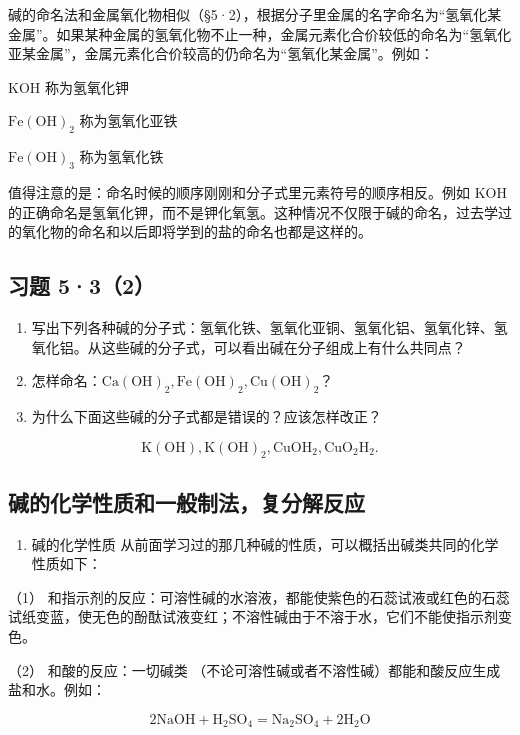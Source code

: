 碱的命名法和金属氧化物相似（§5·2），根据分子里金属的名字命名为``氢氧化某金属''。如果某种金属的氢氧化物不止一种，金属元素化合价较低的命名为``氢氧化亚某金属''，金属元素化合价较高的仍命名为``氢氧化某金属''。例如：

KOH 称为氢氧化钾

\(\mathrm{Fe(OH)}_{2}\) 称为氢氧化亚铁

\(\mathrm{Fe(OH)}_{3}\) 称为氢氧化铁

值得注意的是：命名时候的顺序刚刚和分子式里元素符号的顺序相反。例如 KOH
的正确命名是氢氧化钾，而不是钾化氧氢。这种情况不仅限于碱的命名，过去学过的氧化物的命名和以后即将学到的盐的命名也都是这样的。

\subsection{习题 5·3（2）}

\begin{enumerate}
\item
  写出下列各种碱的分子式：氢氧化铁、氢氧化亚铜、氢氧化铝、氢氧化锌、氢氧化铝。从这些碱的分子式，可以看出碱在分子组成上有什么共同点？
\item
  怎样命名：\(\mathrm{Ca(OH)}_{2}, \mathrm{Fe(OH)}_{2}, \mathrm{Cu(OH)}_{2}\)？
\item
  为什么下面这些碱的分子式都是错误的？应该怎样改正？
\end{enumerate}

\[
\mathrm{K} (\mathrm{OH}), \mathrm{K} (\mathrm{OH}) _ {2}, \mathrm{CuOH}_{2}, \mathrm{CuO}_{2} \mathrm{H}_{2}.
\]

\subsection{碱的化学性质和一般制法，复分解反应}

\begin{enumerate}
\item
  碱的化学性质
  从前面学习过的那几种碱的性质，可以概括出碱类共同的化学性质如下：
\end{enumerate}

（1）
和指示剂的反应：可溶性碱的水溶液，都能使紫色的石蕊试液或红色的石蕊试纸变蓝，使无色的酚酞试液变红；不溶性碱由于不溶于水，它们不能使指示剂变色。

（2） 和酸的反应：一切碱类
（不论可溶性碱或者不溶性碱）都能和酸反应生成盐和水。例如：

\[
2 \mathrm{NaOH} + \mathrm{H}_{2} \mathrm{SO}_{4} = \mathrm{Na}_{2} \mathrm{SO}_{4} + 2 \mathrm{H}_{2} \mathrm{O}
\]


